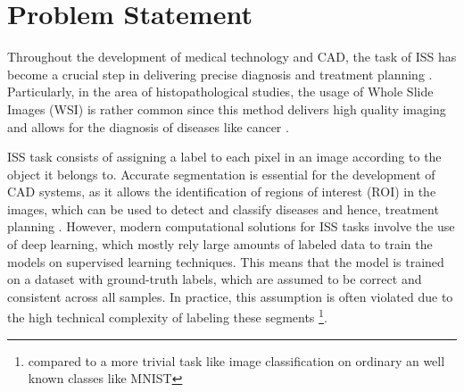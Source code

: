 
\section{Problem Statement}\label{sec:state_of_art}



Throughout the development of medical technology and \gls{CAD}, the
task of \gls{ISS} has become a crucial step in delivering precise diagnosis
and treatment planning \cite{Giri_Bhatia_2024}. Particularly, in the
area of histopathological studies, the usage of Whole Slide Images
(\gls{WSI}) is rather common since this method delivers high quality
imaging and allows for the diagnosis of diseases like cancer
\cite{YujiaEtAl2024}.

\gls{ISS} task consists of assigning a label to each pixel
in an image according to the object it belongs to. Accurate
segmentation is essential for the development of \gls{CAD} systems,
as it allows the identification of regions of interest (\gls{ROI}) in
the images, which can be used to detect and classify diseases and
hence, treatment planning \cite{Sarvamangala2022}. However, modern computational
solutions for \gls{ISS} tasks involve the use of deep learning, which
mostly rely large amounts of labeled data to train the models
on supervised learning techniques. This means that the model is trained on
a dataset with ground-truth labels, which are assumed to be correct
and consistent across all samples. In practice, this assumption is
often violated due to the high technical complexity of labeling these
segments \footnote{compared to a more trivial task like image classification
on ordinary an well known classes like MNIST}.


